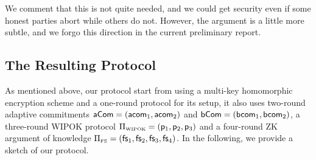 We comment that this is not quite needed, and we could  get security even if some honest parties abort while others do not. However, the argument is a little more subtle, and we forgo this direction in the current preliminary report.


\subsection{The Resulting Protocol}
As mentioned above, our protocol start from using a multi-key homomorphic encryption scheme and a one-round protocol for its setup, it also uses two-round adaptive commitments $\mathsf{aCom}=(\mathsf{acom}_1,\mathsf{acom}_2)$ and $\mathsf{bCom}=({\mathsf{bcom}}_1,{\mathsf{bcom}}_2)$, a three-round WIPOK protocol $\Pi_{\scriptscriptstyle\mathrm{WIPOK}}=(\mathsf{p}_1, \mathsf{p}_2, \mathsf{p}_3)$ and a four-round ZK argument of knowledge $\Pi_{\scriptscriptstyle\mathrm{FS}}=(\mathsf{fs}_1, \mathsf{fs}_2, \mathsf{fs}_3,\mathsf{fs}_4)$. In the following, we provide a sketch of our protocol. 
